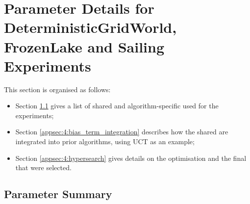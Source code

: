 




















\section[Parameter Details for Gridworld Experiments]{Parameter Details for DeterministicGridWorld, FrozenLake and Sailing Experiments}
\label{appsec:4:hps}

    This section is organised as follows:
    \begin{itemize}
        \item Section \ref{appsec:4:hyperparams} gives a list of shared and algorithm-specific  used for the experiments;
        \item Section \ref{appsec:4:bias_term_integration} describes how the shared  are integrated into prior algorithms, using UCT as an example;
        \item Section \ref{appsec:4:hypersearch} gives details on the  optimisation and the final  that were selected.
    \end{itemize}


\subsection{Parameter Summary}
\label{appsec:4:hyperparams}

